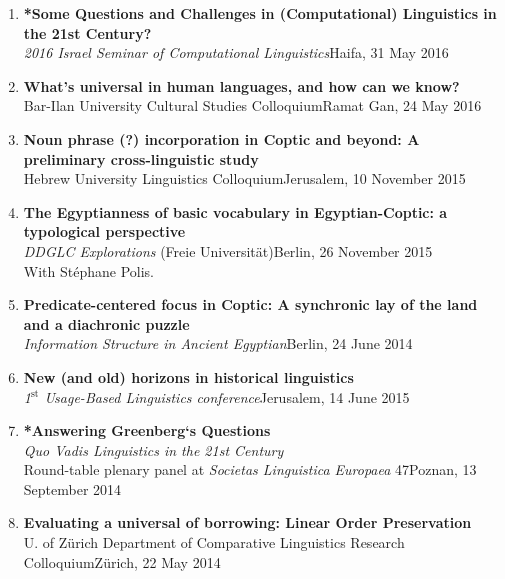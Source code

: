 \documentclass[letterpaper,11pt]{article}
\begin{document}
\begin{enumerate}[resume]
\item \textbf{*Some Questions and Challenges in (Computational) Linguistics in the 21st Century?}\\
\textit{2016 Israel Seminar of Computational Linguistics}\hfill{Haifa, 31 May 2016}

\item \textbf{What’s universal in human languages, and how can we know?}\\Bar-Ilan University Cultural Studies Colloquium\hfill{Ramat Gan, 24 May 2016}

\item \textbf{Noun phrase (?) incorporation in Coptic and beyond: A preliminary cross-linguistic study}\\
Hebrew University Linguistics Colloquium\hfill{Jerusalem, 10 November 2015}

\item \textbf{The Egyptianness of basic vocabulary in Egyptian-Coptic: a typological perspective}\\
\textit{DDGLC Explorations} (Freie Universit\"at)\hfill{Berlin, 26 November 2015}\\With St\'{e}phane Polis.

\item \textbf{Predicate-centered focus in Coptic: A synchronic lay of the land and a diachronic puzzle}\\
\textit{Information Structure in Ancient Egyptian}\hfill{Berlin, 24 June 2014}

\item \textbf{New (and old) horizons in historical linguistics}\\\textit{{1$^{\textrm{st}}$ Usage-Based Linguistics conference}}\hfill{Jerusalem, 14 June 2015}

\item \textbf{*Answering Greenberg`s Questions}\\ 
\textit{Quo Vadis Linguistics in the 21st Century}\\
Round-table plenary panel at \textit{Societas Linguistica Europaea} 47\hfill{Poznan, 13 September 2014}

\item \textbf{Evaluating a universal of borrowing: Linear Order Preservation}\\U. of Z\"urich Department of Comparative Linguistics Research Colloquium\hfill{Z\"urich, 22 May 2014}


\end{enumerate}
\end{document}
